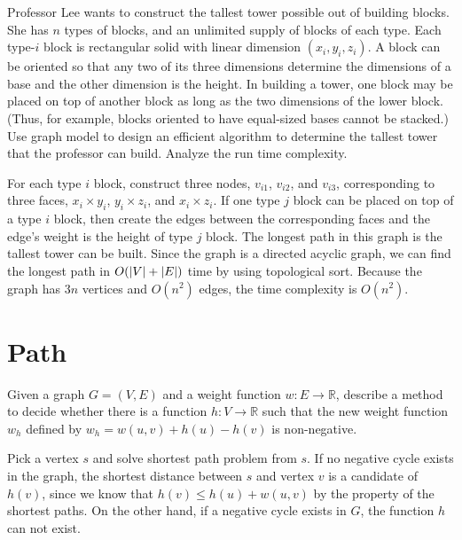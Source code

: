 \begin{Exercise}[origin={CYCU CSIE 92}]
Professor Lee wants to construct the tallest tower possible out of building blocks. She has $n$ types of blocks, and an unlimited supply of blocks of each type. Each type-$i$ block is rectangular solid with linear dimension $(x_i, y_i, z_i)$. A block can be oriented so that any two of its three dimensions determine the dimensions of a base and the other dimension is the height. In building a tower, one block may be placed on top of another block as long as the two dimensions of the lower block. (Thus, for example, blocks oriented to have equal-sized bases cannot be stacked.) Use graph model to design an efficient algorithm to determine the tallest tower that the professor can build. Analyze the run time complexity.
\end{Exercise}
\begin{Answer}
For each type $i$ block, construct three nodes, $v_{i1}$, $v_{i2}$, and $v_{i3}$, corresponding to three faces, $x_i \times y_i$, $y_i \times z_i$, and $x_i \times z_i$.  If one type $j$ block can be placed on top of a type $i$ block, then create the edges between the corresponding faces and the edge's weight is the height of type $j$ block. The longest path in this graph is the tallest tower can be built. Since the graph is a directed acyclic graph, we can find the longest path in $O(\lvert V\rvert + \lvert E\rvert)$ time by using topological sort. Because the graph has $3n$ vertices and $O(n^2)$ edges, the time complexity is $O(n^2)$.
\end{Answer}

\section{Path}
\begin{Exercise}[title={Johnson's algorithm},origin={NTPU CSIE 100}]
Given a graph $G = (V, E)$ and a weight function $w: E \rightarrow \mathbb{R}$, describe a method to decide whether there is a function $h: V \rightarrow \mathbb{R}$ such that the new weight function $w_h$ defined by $w_h = w(u, v) + h(u) - h(v)$ is non-negative.
\end{Exercise}
\begin{Answer}
Pick a vertex $s$ and solve shortest path problem from $s$. If no negative cycle exists in the graph, the shortest distance between $s$ and vertex $v$ is a candidate of $h(v)$, since we know that $h(v) \leq h(u) + w(u, v)$ by the property of the shortest paths. On the other hand, if a negative cycle exists in $G$, the function $h$ can not exist.
\end{Answer}

